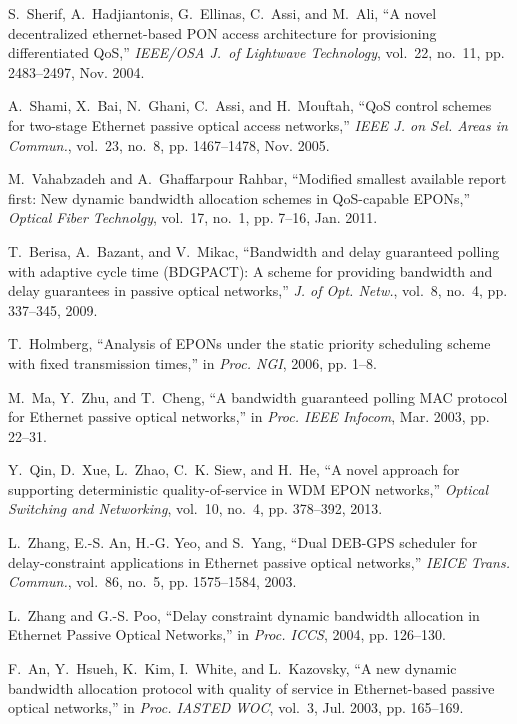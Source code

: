 \documentclass[article]{IEEEtran}
\begin{document}
\begin{thebibliography}{100}
S.~Sherif, A.~Hadjiantonis, G.~Ellinas, C.~Assi, and M.~Ali, ``A novel
  decentralized ethernet-based {PON} access architecture for provisioning
  differentiated {QoS},'' \emph{IEEE/OSA J.\ of Lightwave Technology}, vol.~22,
  no.~11, pp. 2483--2497, Nov. 2004.

A.~Shami, X.~Bai, N.~Ghani, C.~Assi, and H.~Mouftah, ``{QoS} control schemes
  for two-stage {Ethernet} passive optical access networks,'' \emph{IEEE J. on
  Sel. Areas in Commun.}, vol.~23, no.~8, pp. 1467--1478, Nov. 2005.

M.~Vahabzadeh and A.~{Ghaffarpour Rahbar}, ``Modified smallest available report
  first: New dynamic bandwidth allocation schemes in {QoS-capable EPONs},''
  \emph{Optical Fiber Technolgy}, vol.~17, no.~1, pp. 7--16, Jan. 2011.

T.~Berisa, A.~Bazant, and V.~Mikac, ``Bandwidth and delay guaranteed polling
  with adaptive cycle time {(BDGPACT)}: A scheme for providing bandwidth and
  delay guarantees in passive optical networks,'' \emph{J. of Opt. Netw.},
  vol.~8, no.~4, pp. 337--345, 2009.

T.~Holmberg, ``Analysis of {EPONs} under the static priority scheduling scheme
  with fixed transmission times,'' in \emph{Proc. NGI}, 2006, pp. 1--8.

M.~Ma, Y.~Zhu, and T.~Cheng, ``A bandwidth guaranteed polling {MAC} protocol
  for {Ethernet} passive optical networks,'' in \emph{Proc. IEEE Infocom}, Mar.
  2003, pp. 22--31.

Y.~Qin, D.~Xue, L.~Zhao, C.~K. Siew, and H.~He, ``A novel approach for
  supporting deterministic quality-of-service in {WDM} {EPON} networks,''
  \emph{Optical Switching and Networking}, vol.~10, no.~4, pp. 378--392, 2013.

L.~Zhang, E.-S. An, H.-G. Yeo, and S.~Yang, ``Dual {DEB-GPS} scheduler for
  delay-constraint applications in {Ethernet} passive optical networks,''
  \emph{IEICE Trans. Commun.}, vol.~86, no.~5, pp. 1575--1584, 2003.

L.~Zhang and G.-S. Poo, ``Delay constraint dynamic bandwidth allocation in
  {Ethernet Passive Optical Networks},'' in \emph{Proc. ICCS}, 2004, pp.
  126--130.

F.~An, Y.~Hsueh, K.~Kim, I.~White, and L.~Kazovsky, ``A new dynamic bandwidth
  allocation protocol with quality of service in {Ethernet}-based passive
  optical networks,'' in \emph{Proc. IASTED WOC}, vol.~3, Jul. 2003, pp.
  165--169.


\end{thebibliography}
\end{document}
